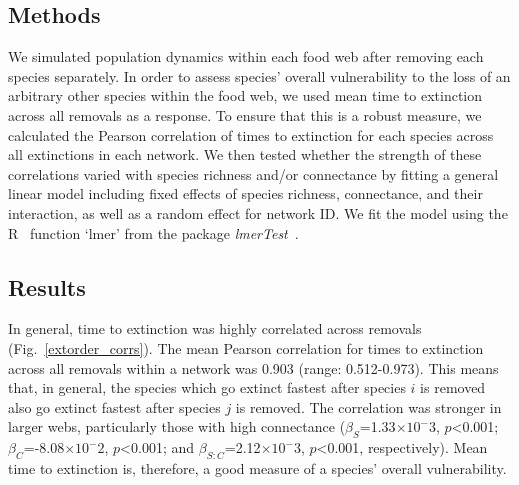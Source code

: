 \documentclass[12pt]{article}
\begin{document}
\begin{spacing}{2.0}
	\subsection*{Methods}

		We simulated population dynamics within each food web after removing each species separately. 
		In order to assess species' overall vulnerability to the loss of an arbitrary other species within the food web, we used mean time to extinction across all removals as a response. 
		To ensure that this is a robust measure, we calculated the Pearson correlation of times to extinction for each species across all extinctions in each network. 
		We then tested whether the strength of these correlations varied with species richness and/or connectance by fitting a general linear model including fixed effects of species richness, connectance, and their interaction, as well as a random effect for network ID. 
		We fit the model using the R~\citep{R} function `lmer' from the package \emph{lmerTest}~\citep{lmerTest}.


	\subsection*{Results}

		In general, time to extinction was highly correlated across removals (Fig.~\ref{extorder_corrs}). %
		The mean Pearson correlation for times to extinction across all removals within a network was 0.903 (range: 0.512-0.973). %
		This means that, in general, the species which go extinct fastest after species $i$ is removed also go extinct fastest after species $j$ is removed.
		The correlation was stronger in larger webs, particularly those with high connectance ($\beta_{S}$=1.33$\times10^-3$, $p$\textless0.001; $\beta_{C}$=-8.08$\times10^-2$, $p$\textless0.001; and $\beta_{S:C}$=2.12$\times10^-3$, $p$\textless0.001, respectively). 
		Mean time to extinction is, therefore, a good measure of a species' overall vulnerability.



\end{spacing}
\end{document}
